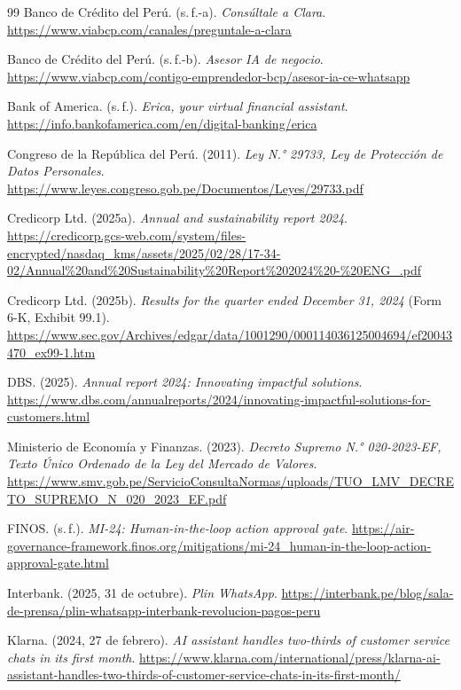 \documentclass[11pt]{article}
\begin{document}
\begin{thebibliography}{99}
Banco de Crédito del Perú. (s.\,f.-a). \textit{Consúltale a Clara}. \url{https://www.viabcp.com/canales/preguntale-a-clara}

Banco de Crédito del Perú. (s.\,f.-b). \textit{Asesor IA de negocio}. \url{https://www.viabcp.com/contigo-emprendedor-bcp/asesor-ia-ce-whatsapp}

Bank of America. (s.\,f.). \textit{Erica, your virtual financial assistant}. \url{https://info.bankofamerica.com/en/digital-banking/erica}

Congreso de la República del Perú. (2011). \textit{Ley N.° 29733, Ley de Protección de Datos Personales}. \url{https://www.leyes.congreso.gob.pe/Documentos/Leyes/29733.pdf}

Credicorp Ltd. (2025a). \textit{Annual and sustainability report 2024}. \url{https://credicorp.gcs-web.com/system/files-encrypted/nasdaq_kms/assets/2025/02/28/17-34-02/Annual%20and%20Sustainability%20Report%202024%20-%20ENG_.pdf}

Credicorp Ltd. (2025b). \textit{Results for the quarter ended December 31, 2024} (Form 6-K, Exhibit 99.1). \url{https://www.sec.gov/Archives/edgar/data/1001290/000114036125004694/ef20043470_ex99-1.htm}

DBS. (2025). \textit{Annual report 2024: Innovating impactful solutions}. \url{https://www.dbs.com/annualreports/2024/innovating-impactful-solutions-for-customers.html}

Ministerio de Economía y Finanzas. (2023). \textit{Decreto Supremo N.° 020-2023-EF, Texto Único Ordenado de la Ley del Mercado de Valores}. \url{https://www.smv.gob.pe/ServicioConsultaNormas/uploads/TUO_LMV_DECRETO_SUPREMO_N_020_2023_EF.pdf}

FINOS. (s.\,f.). \textit{MI-24: Human-in-the-loop action approval gate}. \url{https://air-governance-framework.finos.org/mitigations/mi-24_human-in-the-loop-action-approval-gate.html}

Interbank. (2025, 31 de octubre). \textit{Plin WhatsApp}. \url{https://interbank.pe/blog/sala-de-prensa/plin-whatsapp-interbank-revolucion-pagos-peru}

Klarna. (2024, 27 de febrero). \textit{AI assistant handles two-thirds of customer service chats in its first month}. \url{https://www.klarna.com/international/press/klarna-ai-assistant-handles-two-thirds-of-customer-service-chats-in-its-first-month/}


\end{thebibliography}
\end{document}
